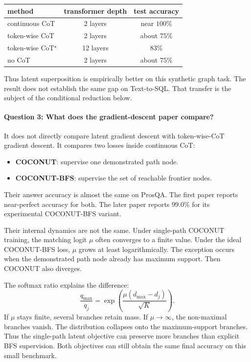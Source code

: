 \documentclass[11pt]{article}
\theoremstyle{definition}
\begin{document}
\begin{center}
\begin{tabular}{lcc}
\toprule
method & transformer depth & test accuracy \\
\midrule
continuous CoT & 2 layers & near $100\%$ \\
token-wise CoT & 2 layers & about $75\%$ \\
token-wise CoT$^\star$ & 12 layers & $83\%$ \\
no CoT & 2 layers & about $75\%$ \\
\bottomrule
\end{tabular}
\end{center}

Thus latent superposition is empirically better on this synthetic graph task. The result does not establish the same gap on Text-to-SQL. That transfer is the subject of the conditional reduction below.

\paragraph{Question 3: What does the gradient-descent paper compare?} It does not directly compare latent gradient descent with token-wise-CoT gradient descent. It compares two losses inside continuous CoT:

\begin{itemize}
\item \textbf{COCONUT}: supervise one demonstrated path node.
\item \textbf{COCONUT-BFS}: supervise the set of reachable frontier nodes.
\end{itemize}

Their answer accuracy is almost the same on ProsQA. The first paper reports near-perfect accuracy for both. The later paper reports $99.0\%$ for its experimental COCONUT-BFS variant.

Their internal dynamics are not the same. Under single-path COCONUT training, the matching logit $\mu$ often converges to a finite value. Under the ideal COCONUT-BFS loss, $\mu$ grows at least logarithmically. The exception occurs when the demonstrated path node already has maximum support. Then COCONUT also diverges.

The softmax ratio explains the difference:
\[
\frac{q_{\max}}{q_j}
=\exp\left(\frac{\mu(d_{\max}-d_j)}{\sqrt K}\right).
\tag{3.6b}
\]
If $\mu$ stays finite, several branches retain mass. If $\mu\to\infty$, the non-maximal branches vanish. The distribution collapses onto the maximum-support branches. Thus the single-path latent objective can preserve more branches than explicit BFS supervision. Both objectives can still obtain the same final accuracy on this small benchmark.
\end{document}

